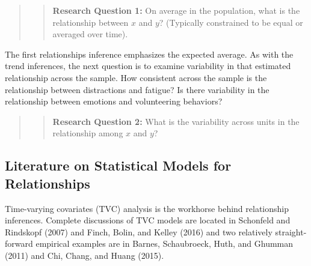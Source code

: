 \documentclass[english,,man]{apa6}
\theoremstyle{definition}
\theoremstyle{definition}
\theoremstyle{definition}
\theoremstyle{remark}
\begin{document}
\begin{quote}
\begin{quote}
\textbf{Research Question 1:} On average in the population, what is the
relationship between \(x\) and \(y\)? (Typically constrained to be equal
or averaged over time).
\end{quote}
\end{quote}

The first relationships inference emphasizes the expected average. As
with the trend inferences, the next question is to examine variability
in that estimated relationship across the sample. How consistent across
the sample is the relationship between distractions and fatigue? Is
there variability in the relationship between emotions and volunteering
behaviors?

\begin{quote}
\begin{quote}
\textbf{Research Question 2:} What is the variability across units in
the relationship among \(x\) and \(y\)?
\end{quote}
\end{quote}

\hypertarget{literature-on-statistical-models-for-relationships}{%
\subsection{Literature on Statistical Models for
Relationships}\label{literature-on-statistical-models-for-relationships}}

Time-varying covariates (TVC) analysis is the workhorse behind
relationship inferences. Complete discussions of TVC models are located
in Schonfeld and Rindskopf (2007) and Finch, Bolin, and Kelley (2016)
and two relatively straight-forward empirical examples are in Barnes,
Schaubroeck, Huth, and Ghumman (2011) and Chi, Chang, and Huang (2015).
\end{document}

